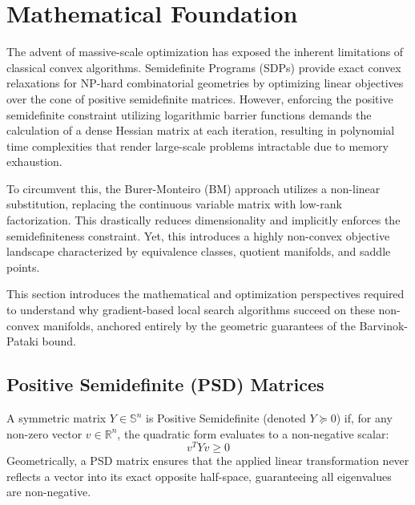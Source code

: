 \newtheorem{theorem}{Theorem}[section]
\newtheorem{lemma}[theorem]{Lemma}
\newtheorem{definition}{Definition}[section]
\newtheorem{assumption}{Assumption}[section]
\newtheorem{proposition}{Proposition}[section]
\newtheorem{corollary}{Corollary}[section]

\newcommand{\Tr}{\mathrm{Tr}}
\newcommand{\rank}{\mathrm{rank}}
\newcommand{\R}{\mathbb{R}}
\newcommand{\Sym}{\mathbb{S}}
\newcommand{\norm}[1]{\left\lVert#1\right\rVert}
\newcommand{\inner}[2]{\langle #1, #2 \rangle}

\section{Mathematical Foundation}

The advent of massive-scale optimization has exposed the inherent limitations of classical convex algorithms. Semidefinite Programs (SDPs) provide exact convex relaxations for NP-hard combinatorial geometries by optimizing linear objectives over the cone of positive semidefinite matrices. However, enforcing the positive semidefinite constraint utilizing logarithmic barrier functions demands the calculation of a dense Hessian matrix at each iteration, resulting in polynomial time complexities that render large-scale problems intractable due to memory exhaustion.

To circumvent this, the Burer-Monteiro (BM) approach utilizes a non-linear substitution, replacing the continuous variable matrix with low-rank factorization. This drastically reduces dimensionality and implicitly enforces the semidefiniteness constraint. Yet, this introduces a highly non-convex objective landscape characterized by equivalence classes, quotient manifolds, and saddle points. 

This section introduces the mathematical and optimization perspectives required to understand why gradient-based local search algorithms succeed on these non-convex manifolds, anchored entirely by the geometric guarantees of the Barvinok-Pataki bound.

\subsection{Positive Semidefinite (PSD) Matrices}
A symmetric matrix $Y \in \Sym^n$ is Positive Semidefinite (denoted $Y \succeq 0$) if, for any non-zero vector $v \in \R^n$, the quadratic form evaluates to a non-negative scalar:
\begin{equation}
v^T Y v \ge 0
\end{equation}
Geometrically, a PSD matrix ensures that the applied linear transformation never reflects a vector into its exact opposite half-space, guaranteeing all eigenvalues are non-negative.

